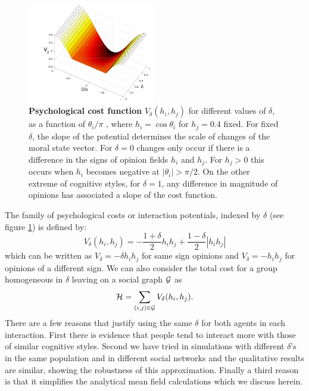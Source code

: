 \documentclass[twocolumn,showpacs]{revtex4-1}
\begin{document}
\begin{figure}[!ht]
\centering \includegraphics[width=0.5\textwidth]{fig3_psychological_cost.png}
\centering \caption{ {\bf Psychological cost function} $ V_\delta (h_i,h_j)$
for different values of $\delta$, as a function of 
$\theta_i/\pi$ , where 
$h_i
= \cos \theta_i$ 
for $h_j=0.4$ fixed. For fixed $\delta$, the
slope of the potential determines the scale of changes of the 
moral state vector. 
For $\delta=0$ changes only occur if there is a difference in 
the signs of opinion fields  $h_i$ and $h_j$. 
For $h_j>0$ this
occurs when $h_i$ becomes negative at $|\theta_i| > \pi/2$. 
On the
other extreme of cognitive styles, for $\delta=1$, any difference 
in magnitude of opinions has associated a slope of the cost function.
 }\label{fig:potencial}
\end{figure}


The family of psychological costs or interaction potentials, indexed by
$\delta$ (see figure \ref{fig:potencial}) is defined by:
\begin{equation}
V_\delta(h_i, h_j)= -\frac{1+\delta}{2} h_i h_j +
\frac{1-\delta}{2}|h_i h_j|
\label{socialcost}
\end{equation}
which can be written as 
 $V_\delta= -\delta h_i h_j$ for same sign opinions 
and  $V_\delta= - h_i h_j$ for opinions of a different sign.
We can also consider the total cost for a group homogeneous in $\delta$ leaving 
on a social graph ${\cal G}$ as
\begin{equation}
{\cal H}=\sum_{(i,j) \in {\cal G}} 
V_\delta(h_i, h_j).
\label{hamiltonian}
\end{equation}
There are a few reasons that justify using the same $\delta$ for both  agents in each interaction. First there is 
evidence \cite{Spears} that people tend to interact more with
those of similar cognitive styles. Second we have tried in simulations
with different $\delta$'s in the same population and in different
social networks and the qualitative results are similar, showing 
the robustness of this approximation. Finally a third reason 
is that it simplifies the analytical 
mean field calculations which we  discuss herein.
\end{document}
